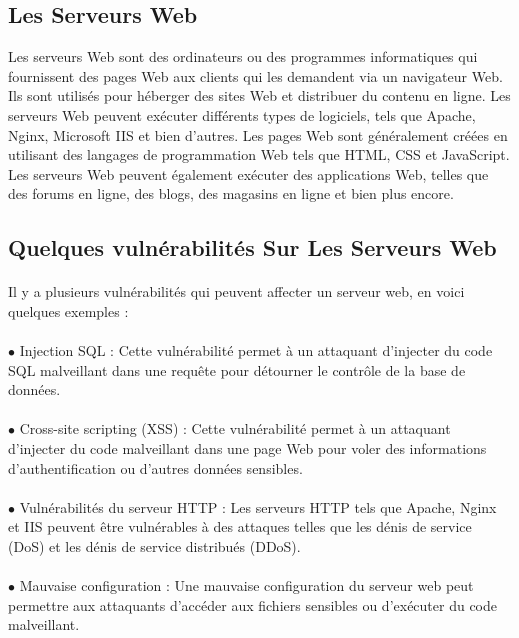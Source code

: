\documentclass{report}
\begin{document}
  \subsection{Les Serveurs Web}
  Les serveurs Web sont des ordinateurs ou des programmes informatiques qui fournissent des pages Web aux clients qui les demandent via un navigateur Web. Ils sont utilisés pour héberger des sites Web et distribuer du contenu en ligne. Les serveurs Web peuvent exécuter différents types de logiciels, tels que Apache, Nginx, Microsoft IIS et bien d'autres. Les pages Web sont généralement créées en utilisant des langages de programmation Web tels que HTML, CSS et JavaScript. Les serveurs Web peuvent également exécuter des applications Web, telles que des forums en ligne, des blogs, des magasins en ligne et bien plus encore.
  \subsection{Quelques vulnérabilités Sur Les Serveurs Web }
  \paragraph{ }
  Il y a plusieurs vulnérabilités qui peuvent affecter un serveur web, en voici quelques exemples :
  \paragraph{ }
  $\bullet$ Injection SQL : Cette vulnérabilité permet à un attaquant d'injecter du code SQL malveillant dans une requête pour détourner le contrôle de la base de données.
  \paragraph{ }
  $\bullet$ Cross-site scripting (XSS) : Cette vulnérabilité permet à un attaquant d'injecter du code malveillant dans une page Web pour voler des informations d'authentification ou d'autres données sensibles.
  \paragraph{ }
  $\bullet$ Vulnérabilités du serveur HTTP : Les serveurs HTTP tels que Apache, Nginx et IIS peuvent être vulnérables à des attaques telles que les dénis de service (DoS) et les dénis de service distribués (DDoS).
  \paragraph{ }
  $\bullet$ Mauvaise configuration : Une mauvaise configuration du serveur web peut permettre aux attaquants d'accéder aux fichiers sensibles ou d'exécuter du code malveillant.
\end{document}
